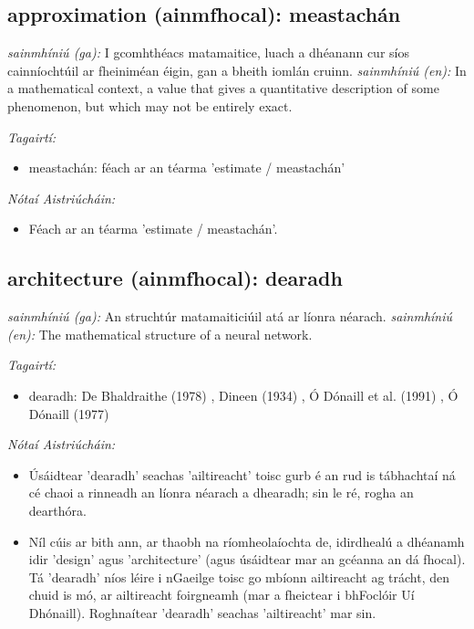 \documentclass{article}
\begin{document}
\subsection*{approximation (ainmfhocal): meastachán} 
 \noindent \textit{sainmhíniú (ga):} I gcomhthéacs matamaitice, luach a dhéanann cur síos cainníochtúil ar fheiniméan éigin, gan a bheith iomlán cruinn.
\newline\newline
 \noindent \textit{sainmhíniú (en):} In a mathematical context, a value that gives a quantitative description of some phenomenon, but which may not be entirely exact.
\newline

 \noindent \textit{Tagairtí:}
\begin{itemize}
	\item meastachán: féach ar an téarma 'estimate / meastachán'
\end{itemize}

 \noindent \textit{Nótaí Aistriúcháin:}
\begin{itemize}
	\item Féach ar an téarma 'estimate / meastachán'.
\end{itemize}


\subsection*{architecture (ainmfhocal): dearadh} 
 \noindent \textit{sainmhíniú (ga):} An struchtúr matamaiticiúil atá ar líonra néarach.
\newline\newline
 \noindent \textit{sainmhíniú (en):} The mathematical structure of a neural network.
\newline

 \noindent \textit{Tagairtí:}
\begin{itemize}
	\item dearadh: De Bhaldraithe (1978) \cite{de-bhaldraithe}, Dineen (1934) \cite{dineen}, Ó Dónaill et al. (1991) \cite{focloir-beag}, Ó Dónaill (1977) \cite{odonaill}
\end{itemize}

 \noindent \textit{Nótaí Aistriúcháin:}
\begin{itemize}
	\item Úsáidtear 'dearadh' seachas 'ailtireacht' toisc gurb é an rud is tábhachtaí ná cé chaoi a rinneadh an líonra néarach a dhearadh; sin le ré, rogha an dearthóra.
	\item Níl cúis ar bith ann, ar thaobh na ríomheolaíochta de, idirdhealú a dhéanamh idir 'design' agus 'architecture' (agus úsáidtear mar an gcéanna an dá fhocal). Tá 'dearadh' níos léire i nGaeilge toisc go mbíonn ailtireacht ag trácht, den chuid is mó, ar ailtireacht foirgneamh (mar a fheictear i bhFoclóir Uí Dhónaill). Roghnaítear 'dearadh' seachas 'ailtireacht' mar sin.
\end{itemize}
\end{document}
